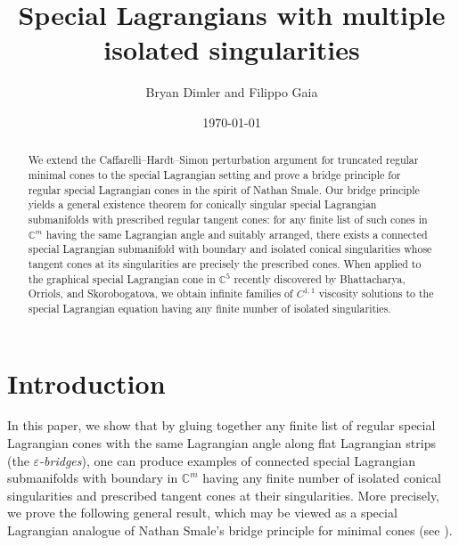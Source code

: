 \documentclass[11pt]{amsart}
\title[Special Lagrangians with isolated singularities]{Special Lagrangians with multiple isolated singularities}
\author{Bryan Dimler and Filippo Gaia}
\date{\today}
\theoremstyle{definition}
\theoremstyle{remark}
\newcommand{\C}{\mathbb{C}}
\begin{document}
\begin{abstract}
We extend the Caffarelli–Hardt–Simon perturbation argument for truncated regular minimal cones to the special Lagrangian setting and prove a bridge principle for regular special Lagrangian cones in the spirit of Nathan Smale. Our bridge principle yields a general existence theorem for conically singular special Lagrangian submanifolds with prescribed regular tangent cones: for any finite list of such cones in $\mathbb C^m$ having the same Lagrangian angle and suitably arranged, there exists a connected special Lagrangian submanifold with boundary and isolated conical singularities whose tangent cones at its singularities are precisely the prescribed cones. When applied to the graphical special Lagrangian cone in $\mathbb{C}^5$ recently discovered by Bhattacharya, Orriols, and Skorobogatova, we obtain infinite families of $C^{1,1}$ viscosity solutions to the special Lagrangian equation having any finite number of isolated singularities.
\end{abstract}

\maketitle

\section{Introduction}
In this paper, we show that by gluing together any finite list of regular special Lagrangian cones with the same Lagrangian angle along flat Lagrangian strips (the \emph{$\varepsilon$-bridges}), one can produce examples of connected special Lagrangian submanifolds with boundary in $\C^m$ having any finite number of isolated conical singularities and prescribed tangent cones at their singularities.
More precisely, we prove the following general result, which may be viewed as a special Lagrangian analogue of Nathan Smale's bridge principle for minimal cones (see \cite{Sm89, Sm93}).
\end{document}

